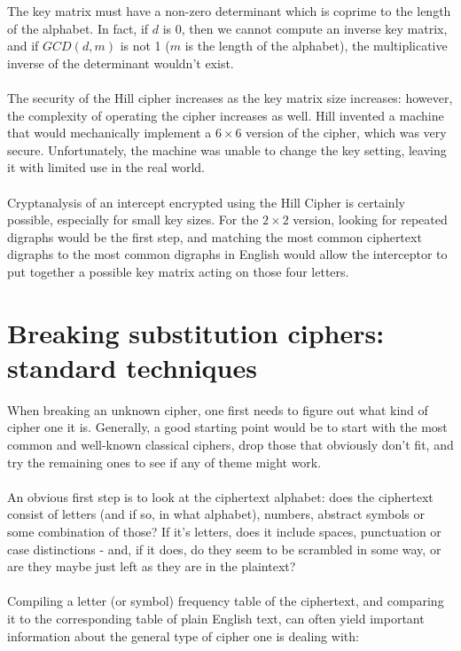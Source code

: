 \documentclass[Lau,binding=0.6cm,oneside]{sapthesis}
\begin{document}
The key matrix must have a non-zero determinant which is coprime to the length of the alphabet. In fact, if $d$ is 0, then we cannot compute an inverse key matrix, and if $GCD(d, m)$ is not 1 ($m$ is the length of the alphabet), the multiplicative inverse of the determinant wouldn't exist.\\\\
The security of the Hill cipher increases as the key matrix size increases: however, the complexity of operating the cipher increases as well. Hill invented a machine that would mechanically implement a $6 \times 6$ version of the cipher, which was very secure. Unfortunately, the machine was unable to change the key setting, leaving it with limited use in the real world.\\\\
Cryptanalysis of an intercept encrypted using the Hill Cipher is certainly possible, especially for small key sizes. For the $2 \times 2$ version, looking for repeated digraphs would be the first step, and matching the most common ciphertext digraphs to the most common digraphs in English would allow the interceptor to put together a possible key matrix acting on those four letters.

\chapter{Breaking substitution ciphers: standard techniques}
When breaking an unknown cipher, one first needs to figure out what kind of cipher one it is. Generally, a good starting point would be to start with the most common and well-known classical ciphers, drop those that obviously don't fit, and try the remaining ones to see if any of theme might work.\\\\
An obvious first step is to look at the ciphertext alphabet: does the ciphertext consist of letters (and if so, in what alphabet), numbers, abstract symbols or some combination of those? If it's letters, does it include spaces, punctuation or case distinctions - and, if it does, do they seem to be scrambled in some way, or are they maybe just left as they are in the plaintext?\\\\
Compiling a letter (or symbol) frequency table of the ciphertext, and comparing it to the corresponding table of plain English text, can often yield important information about the general type of cipher one is dealing with:
\end{document}
